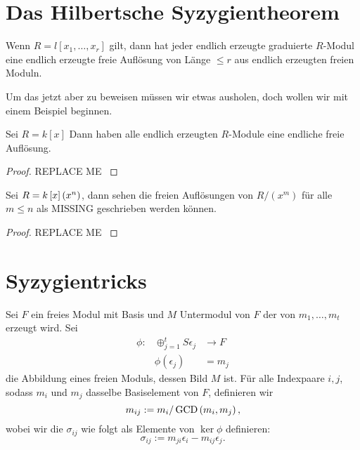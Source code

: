 \documentclass{article}
\begin{document}
\section{Das Hilbertsche Syzygientheorem}
	\begin{thm}
		Wenn 
		\( R = l \left[ x_1,\dots,x_r \right] \)
		gilt,
		dann hat jeder endlich erzeugte graduierte 
		\(R \)-Modul 
		eine endlich erzeugte freie Aufl\"osung von L\"ange 
		\( \le r \) 
		aus endlich erzeugten freien Moduln.
	\end{thm}
	Um das jetzt aber zu beweisen m\"ussen wir etwas ausholen, 
	doch wollen wir mit einem Beispiel beginnen.
	\begin{bsp}[\nocite{Eis1}{Exercise 1.22}]
		Sei 
		\( R = k\left[ x \right] \)
		Dann haben alle endlich erzeugten 
		\(R\)-Module 
		eine endliche freie Aufl\"osung.
		\begin{proof}
			{\color{red} REPLACE ME }		
		\end{proof}
	\end{bsp}	
	\begin{thm}
		
	\end{thm}
	\begin{bsp}
		Sei 
		\( R= k\left[ x \right] \/ \left( x^{n} \right) \),
		dann sehen die freien Aufl\"osungen von 
		\( R\big/ \left( x^{m} \right) \) 
		f\"ur alle 
		\( m \le n \)
		als 
		{\color{red}MISSING}
		geschrieben werden k\"onnen.
		\begin{proof}
			{\color{red} REPLACE ME }
		\end{proof}
	\end{bsp}
\section{Syzygientricks}

	\begin{nota}
		Sei 
		\( F \) 
		ein freies Modul mit Basis 
		und
		\( M \)
		Untermodul von 
		\( F \)
		der von 
		\( m_{1} , \dots , m_{t} \)
		erzeugt wird.
		Sei
		\begin{align*}
			\phi:	& \oplus_{j=1}^{t} S\epsilon_{j} &\to   F \\
				& \phi\left( \epsilon_{j} \right) &=  m_{j}
		\end{align*}
		die Abbildung eines freien Moduls, dessen Bild
		\( M \)
		ist.
		F\"ur alle Indexpaare 	
		\( i,j \),
		sodass 
		\( m_{i}\)
		und 
		\( m_{j}\)
		dasselbe Basiselement von 
		\( F \),
		definieren wir 
		\[
			m_{ij} := m_{i}/\operatorname{GCD}\left( m_{i},m_{j} \right) ,
		\]
		wobei wir die 
		\( \sigma_{ij}\)
		wie folgt als Elemente von 
		\( \ker \phi \)
		definieren:
		\[
			\sigma_{ij} := m_{ji}\epsilon_{i}-m_{ij}\epsilon_{j} .
		\]

	\end{nota}
\end{document}
